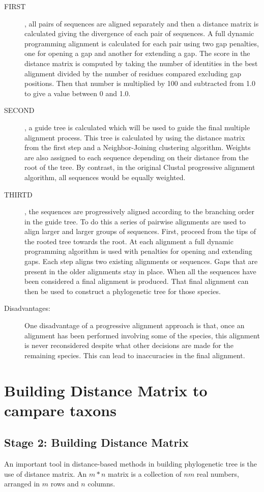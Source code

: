 \begin{description}
\item[FIRST], all pairs of sequences are aligned separately and then a distance 
matrix is calculated giving the divergence of each pair of sequences. A full 
dynamic programming alignment is calculated for each pair using two gap 
penalties, one for opening a gap and another for extending a gap. The score in the 
distance matrix is computed by taking the number of identities in the best 
alignment divided by the number of residues compared excluding gap positions. 
Then that number is multiplied by 100 and subtracted from 1.0 to give a value 
between 0 and 1.0.
\item[SECOND], a guide tree is calculated which will be used to guide the final 
multiple alignment process. This tree is calculated by using the distance matrix 
from the first step and a Neighbor-Joining clustering algorithm. Weights are also 
assigned to each sequence depending on their distance from the root of the tree. By 
contrast, in the original Clustal progressive alignment algorithm, all sequences 
would be equally weighted. 
\item[THIRTD], the sequences are progressively aligned according to the branching 
order in the guide tree. To do this a series of pairwise alignments are used to align 
larger and larger groups of sequences. First, proceed from the tips of the rooted 
tree towards the root. At each alignment a full dynamic programming algorithm is 
used with penalties for opening and extending gaps. Each step aligns two existing 
alignments or sequences. Gaps that are present in the older alignments stay in 
place. When all the sequences have been considered a final alignment is produced. 
That final alignment can then be used to construct a phylogenetic tree for those 
species. 
\item[Disadvantages:] One disadvantage of a progressive alignment approach is that, once an 
alignment has been performed involving some of the species, this alignment is 
never reconsidered despite what other decisions are made for the remaining species. 
This can lead to inaccuracies in the final alignment.
\end{description}

\section{Building Distance Matrix to campare taxons}

\subsection{Stage 2: Building Distance Matrix} \label{phase2}
An important tool in distance-based methods in building phylogenetic 
tree is the use of distance matrix. An $m*n$ matrix is a collection 
of $nm$ real numbers, arranged in $m$ rows and $n$ columns.

